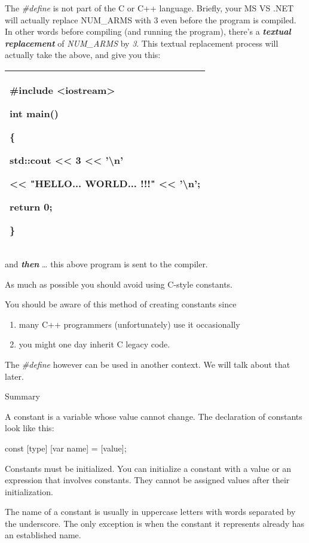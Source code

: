 \documentclass[
]{article}
\providecommand{\tightlist}{%
  \setlength{\itemsep}{0pt}\setlength{\parskip}{0pt}}
\begin{document}
The \emph{\#define} is not part of the C or C++ language. Briefly, your
MS VS .NET will actually replace NUM\_ARMS with 3 even before the
program is compiled. In other words before compiling (and running the
program), there's a \emph{\textbf{textual replacement}} of
\emph{NUM\_ARMS} by \emph{3}. This textual replacement process will
actually take the above, and give you this:

\begin{longtable}[]{@{}l@{}}
\toprule
\endhead
\begin{minipage}[t]{0.97\columnwidth}\raggedright
\#include \textless iostream\textgreater{}

int main()

\{

std::cout \textless\textless{} 3 \textless\textless{} '\textbackslash n'

\textless\textless{} "HELLO... WORLD... !!!" \textless\textless{}
'\textbackslash n';

return 0;

\}\strut
\end{minipage}\tabularnewline
\bottomrule
\end{longtable}

and \emph{\textbf{then}} \ldots{} this above program is sent to the
compiler.

As much as possible you should avoid using C-style constants.

You should be aware of this method of creating constants since

\begin{enumerate}
\def\labelenumi{\arabic{enumi}.}
\tightlist
\item
  many C++ programmers (unfortunately) use it occasionally
\item
  you might one day inherit C legacy code.
\end{enumerate}

The \emph{\#define} however can be used in another context. We will talk
about that later.

Summary

A constant is a variable whose value cannot change. The declaration of
constants look like this:

const {[}type{]} {[}var name{]} = {[}value{]};

Constants must be initialized. You can initialize a constant with a
value or an expression that involves constants. They cannot be assigned
values after their initialization.

The name of a constant is usually in uppercase letters with words
separated by the underscore. The only exception is when the constant it
represents already has an established name.
\end{document}
